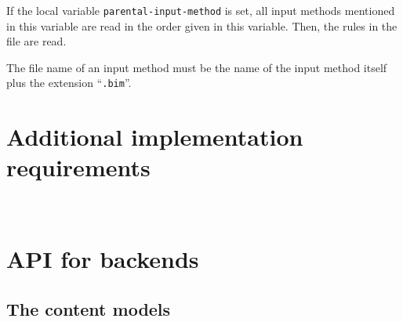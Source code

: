 \documentclass[12pt,openany]{book}
\begin{document}
If the local variable \verb|parental-input-method| is set, all input methods
mentioned in this variable are read in the order given in this variable.  Then,
the rules in the file are read.

The file name of an input method must be the name of the input method itself
plus the extension ``\verb|.bim|''.

\section{Additional implementation requirements}

~

\section{API for backends}

\subsection{The content models}

\makeatletter
\newcommand*{\contentmodel}[3]{\bigskip\bigskip\begingroup\par\noindent
  \fbox{\vbox{\raggedright\parindent0pt\hangafter1\hangindent1em
      \emph{Content model of} \texttt{\textbf{#1}}:\quad
      \texttt{#2}%
      \ifx#3\@empty\else\par\hangafter1\hangindent1em
      \emph{Further constraints}:\quad#3\par\fi}}\par
  \endgroup\vspace*{1ex}\par\noindent\ignorespaces}
\newenvironment{attributes}[1][Attributes]{\noindent\emph{#1:}\vspace*{-1ex}\begin{description*}}{\end{description*}}
\newcommand{\attribute}[3]{\item[\texttt{#1} \textmd{(#2)}]\hskip0.5em #3}
\newenvironment{key-values}{\vspace*{-0.8ex}\begin{description*}}{\end{description*}}
\newcommand{\keyvalue}[3]{\item[\texttt{#1} \textmd{(#2)}]\hskip0.5em #3}
\makeatother
\newcommand{\rep}{\raisebox{-0.3ex}{\kern0.1em*}}
\newcommand{\opt}{\kern0.1em?}
\newcommand{\repp}{\kern0.1em+}
\end{document}
